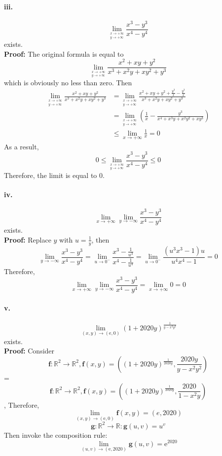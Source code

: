 \documentclass[11pt, a4paper]{article}
\begin{document}
\paragraph{iii.}
$$\lim\limits_{^{x \to +\infty}_{y \to +\infty}} \frac{x ^ 3 - y ^ 3}{x ^ 4 - y ^ 4}$$ exists. \\
\textbf{Proof:} The original formula is equal to 
$$\lim\limits_{^{x \to +\infty}_{y \to +\infty}} \frac{x ^ 2 + xy + y ^ 2}{x ^ 3 + x ^ 2 y + x y ^ 2 + y ^ 3}$$ which is obviously no less than zero. Then
$$\begin{aligned}
\lim\limits_{^{x \to +\infty}_{y \to +\infty}} \frac{x ^ 2 + xy + y ^ 2}{x ^ 3 + x ^ 2 y + x y ^ 2 + y ^ 3} &= 
\lim\limits_{^{x \to +\infty}_{y \to +\infty}} \frac{x ^ 2 + xy + y ^ 2 + \frac{y ^ 3}{x} - \frac{y ^3}{x}}{x ^ 3 + x ^ 2 y + x y ^ 2 + y ^ 3} \\
&= 
\lim\limits_{^{x \to +\infty}_{y \to +\infty}} (\frac{1}{x} - \frac{y ^ 3}{x ^ 4 + x ^ 3 y + x ^ 2 y ^ 2 + x y ^ 3}) \\
&\leq 
\lim_{x \to +\infty} \frac{1}{x} = 0
\end{aligned}$$
As a result, 
$$0 \leq \lim\limits_{^{x \to +\infty}_{y \to +\infty}} \frac{x ^ 3 - y ^ 3}{x ^ 4 - y ^ 4} \leq 0$$
Therefore, the limit is equal to 0.

\paragraph{iv.}

$$\lim_{x \to +\infty}\lim_{y \to -\infty} \frac{x ^ 3 - y ^ 3}{x ^ 4 - y ^ 4}$$ exists. \\
\textbf{Proof:} Replace $y$ with $u = \frac{1}{y}$, then
$$\lim_{y \to -\infty} \frac{x ^ 3 - y ^ 3}{x ^ 4 - y ^ 4} = \lim_{u \to 0 ^ -} \frac{x ^ 3 - \frac{1}{u ^ 3}}{{x ^ 4 - \frac{1}{u ^ 4}}} = \lim_{u \to 0 ^ -} \frac{(u ^ 3 x ^ 3 - 1)u}{u ^ 4 x ^ 4 - 1} = 0$$
Therefore,
$$\lim_{x \to +\infty}\lim_{y \to -\infty} \frac{x ^ 3 - y ^ 3}{x ^ 4 - y ^ 4} = \lim_{x \to +\infty} 0 = 0$$

\paragraph{v.}
$$\lim_{(x, y) \to (\mathrm{e}, 0)}(1 + 2020y)^{\frac{1}{y - x ^ 2 y ^ 2}}$$ exists. \\
\textbf{Proof:} Consider 
$$\bm{f}: \mathbb{R} ^ 2 \to \mathbb{R} ^ 2, \bm{f}(x, y) = ((1 + 2020y) ^ \frac{1}{2020y}, \frac{2020y}{y - x ^ 2 y ^ 2})$$ = 
$$\bm{f}: \mathbb{R} ^ 2 \to \mathbb{R} ^ 2, \bm{f}(x, y) = ((1 + 2020y) ^ \frac{1}{2020y}, \frac{2020}{1 - x ^ 2 y})$$,
Therefore, 
$$\lim_{(x, y) \to (\mathrm{e}, 0)} \bm{f}(x, y) = (e, 2020)$$
$$\bm{g}: \mathbb{R} ^ 2 \to \mathbb{R}: \bm{g}(u, v) = u ^ v$$
Then invoke the composition rule:
$$\lim_{(u, v) \to (\mathrm{e}, 2020)} \bm{g}(u, v) = \mathrm{e} ^ {2020}$$
\end{document}
